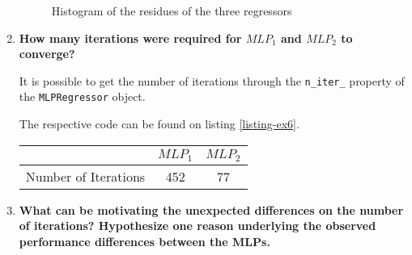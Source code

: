 \documentclass[12pt]{article}
\begin{document}
\begin{enumerate}[leftmargin=\labelsep,resume]
          \begin{figure}[H]
              \centering
              
              \caption{Histogram of the residues of the three regressors}
              \label{fig:histogram}
          \end{figure}

    \item {\color{questioncolor}\bfseries
          How many iterations were required for $MLP_1$ and $MLP_2$ to converge?
          }\\
          \vspace{0.5em}

          It is possible to get the number of iterations through the
          \texttt{n\_iter\_} property of the \texttt{MLPRegressor} object.

          The respective code can be found on listing \ref{listing-ex6}.

          \begin{center}
              \captionsetup{type=table}
              \begin{tabular}{c|c|c}
                                       & $MLP_1$ & $MLP_2$ \\
                  \hline
                  Number of Iterations & 452     & 77
              \end{tabular}
          \end{center}

    \item {\color{questioncolor}\bfseries
          What can be motivating the unexpected differences on the number of iterations?
          Hypothesize one reason underlying the observed performance differences between the MLPs.
          }\\
          \vspace{0.5em}


\end{enumerate}
\end{document}
